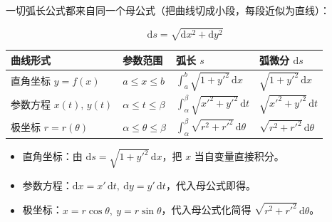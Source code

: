 \documentclass[12pt,a4paper]{ctexart}
\begin{document}

一切弧长公式都来自同一个母公式（把曲线切成小段，每段近似为直线）：

\[
\mathrm{d}s=\sqrt{\mathrm{d}x^{2}+\mathrm{d}y^{2}}
\]

\begin{center}\small
\begin{tabularx}{\linewidth}{@{}>{\raggedright\arraybackslash}X>{\raggedright\arraybackslash}X>{\raggedright\arraybackslash}X>{\raggedright\arraybackslash}X@{}}
\toprule
曲线形式 & 参数范围 & 弧长 $s$ & 弧微分 $\mathrm{d}s$ \\
\midrule
直角坐标 $y=f(x)$ & $a\le x\le b$ & $\displaystyle\int_a^b\sqrt{1+y'^{2}}\,\mathrm{d}x$ & $\sqrt{1+y'^{2}}\,\mathrm{d}x$ \\
参数方程 $x(t),\,y(t)$ & $\alpha\le t\le\beta$ & $\displaystyle\int_\alpha^\beta\sqrt{x'^{2}+y'^{2}}\,\mathrm{d}t$ & $\sqrt{x'^{2}+y'^{2}}\,\mathrm{d}t$ \\
极坐标 $r=r(\theta)$ & $\alpha\le\theta\le\beta$ & $\displaystyle\int_\alpha^\beta\sqrt{r^{2}+r'^{2}}\,\mathrm{d}\theta$ & $\sqrt{r^{2}+r'^{2}}\,\mathrm{d}\theta$ \\
\bottomrule
\end{tabularx}
\end{center}



\begin{itemize}

\item 直角坐标：由 $\mathrm{d}s=\sqrt{1+y'^{2}}\,\mathrm{d}x$，把 $x$ 当自变量直接积分。

\item 参数方程：$\mathrm{d}x=x'\,\mathrm{d}t,\ \mathrm{d}y=y'\,\mathrm{d}t$，代入母公式即得。

\item 极坐标：$x=r\cos\theta,\ y=r\sin\theta$，代入母公式化简得 $\sqrt{r^{2}+r'^{2}}\,\mathrm{d}\theta$。

\end{itemize}


\end{document}

